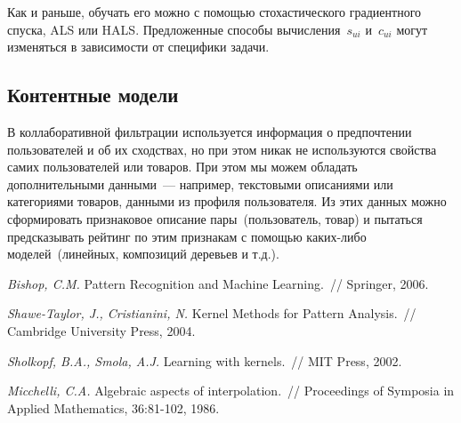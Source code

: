 \documentclass[12pt,fleqn]{article}
\begin{document}
Как и раньше, обучать его можно с помощью стохастического градиентного спуска, ALS или HALS.
Предложенные способы вычисления~$s_{ui}$ и~$c_{ui}$ могут изменяться в зависимости от специфики задачи.

\subsection{Контентные модели}
В коллаборативной фильтрации используется информация о предпочтении пользователей и об их сходствах,
но при этом никак не используются свойства самих пользователей или товаров.
При этом мы можем обладать дополнительными данными~--- например, текстовыми описаниями или категориями товаров,
данными из профиля пользователя.
Из этих данных можно сформировать признаковое описание пары~(пользователь, товар) и
пытаться предсказывать рейтинг по этим признакам с помощью каких-либо моделей~(линейных, композиций деревьев и т.д.).

\begin{thebibliography}{1}
    \emph{Bishop, C.M.}
    Pattern Recognition and Machine Learning.~//
    Springer, 2006.

    \emph{Shawe-Taylor, J., Cristianini, N.}
    Kernel Methods for Pattern Analysis.~//
    Cambridge University Press, 2004.

    \emph{Sholkopf, B.A., Smola, A.J.}
    Learning with kernels.~//
    MIT Press, 2002.

    \emph{Micchelli, C.A.}
    Algebraic aspects of interpolation.~//
    Proceedings of Symposia in Applied Mathematics, 36:81-102, 1986.
\end{thebibliography}
\end{document}
